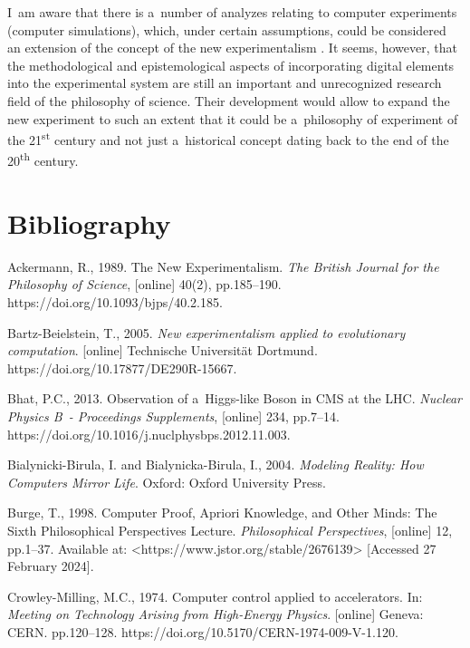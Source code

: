 I~am aware that there is a~number of analyzes relating to computer experiments (computer simulations), which, under certain assumptions, could be considered an extension of the concept of the new experimentalism 
\parencite[][]{bartz-beielstein_new_2005}. %
 It seems, however, that the methodological and epistemological aspects of incorporating digital elements into the experimental system are still an important and unrecognized research field of the philosophy of science. Their development would allow to expand the new experiment to such an extent that it could be a~philosophy of experiment of the 21\textsuperscript{st} century and not just a~historical concept dating back to the end of the 20\textsuperscript{th} century.



\section{Bibliography}

Ackermann, R., 1989. The New Experimentalism. \textit{The British Journal for the Philosophy of Science}, [online] 40(2), pp.185–190. https://doi.org/10.1093/bjps/40.2.185.



Bartz-Beielstein, T., 2005. \textit{New experimentalism applied to evolutionary computation}. [online] Technische Universität Dortmund. https://doi.org/10.17877/DE290R-15667.



Bhat, P.C., 2013. Observation of a~Higgs-like Boson in CMS at the LHC. \textit{Nuclear Physics B~- Proceedings Supplements}, [online] 234, pp.7–14. https://doi.org/10.1016/j.nuclphysbps.2012.11.003.



Bialynicki-Birula, I. and Bialynicka-Birula, I., 2004. \textit{Modeling Reality: How Computers Mirror Life}. Oxford: Oxford University Press.



Burge, T., 1998. Computer Proof, Apriori Knowledge, and Other Minds: The Sixth Philosophical Perspectives Lecture. \textit{Philosophical Perspectives}, [online] 12, pp.1–37. Available at: {\textless}https://www.jstor.org/stable/2676139{\textgreater} [Accessed 27 February 2024].



Crowley-Milling, M.C., 1974. Computer control applied to accelerators. In: \textit{Meeting on Technology Arising from High-Energy Physics}. [online] Geneva: CERN. pp.120–128. https://doi.org/10.5170/CERN-1974-009-V-1.120.



